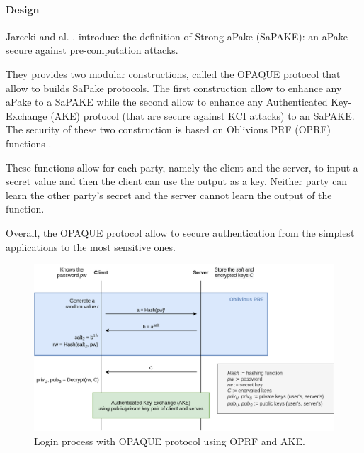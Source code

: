 \documentclass[../report.tex]{subfiles}
\begin{document}




\paragraph{Design}
Jarecki and al. \cite{}. introduce the definition of Strong aPake (SaPAKE): an aPake secure against pre-computation attacks.

They provides two modular constructions, called the OPAQUE protocol that allow to builds SaPake protocols. The first construction allow to enhance any aPake to a SaPAKE while the second allow to enhance any Authenticated Key-Exchange (AKE) protocol (that are secure against KCI attacks) to an SaPAKE.
The security of these two construction is based on Oblivious PRF (OPRF) functions \cite{}.

These functions allow for each party, namely the client and the server, to input a secret value and then the client can use the output as a key. Neither party can learn the other party's secret and the server cannot learn the output of the function.

Overall, the OPAQUE protocol allow to secure authentication from the simplest applications to the most sensitive ones.


\begin{figure}[h]
 \centering
 \includegraphics[width=\textwidth]{OPAQUE.png}
 \caption{Login process with OPAQUE protocol using OPRF and AKE.}
 \label{fig:OPAQUE_AKE}
\end{figure}
\end{document}
